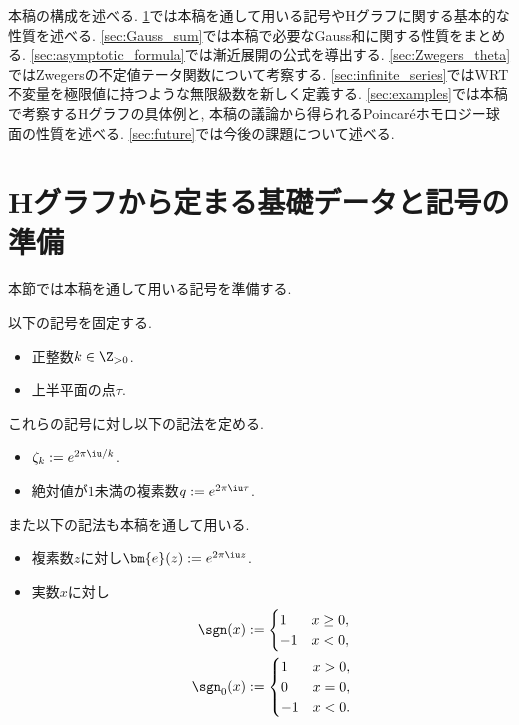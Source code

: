 \documentclass[11pt,b5paper,oneside,lualatex]{ltjsarticle} %
\numberwithin{equation}{section} %
\begin{document}
本稿の構成を述べる. 
\cref{sec:fund_data}では本稿を通して用いる記号やHグラフに関する基本的な性質を述べる. 
\cref{sec:Gauss_sum}では本稿で必要なGauss和に関する性質をまとめる. 
\cref{sec:asymptotic_formula}では漸近展開の公式を導出する. 
\cref{sec:Zwegers_theta}ではZwegersの不定値テータ関数について考察する. 
\cref{sec:infinite_series}ではWRT不変量を極限値に持つような無限級数を新しく定義する. 
\cref{sec:examples}では本稿で考察するHグラフの具体例と, 本稿の議論から得られるPoincar\'{e}ホモロジー球面の性質を述べる. 
\cref{sec:future}では今後の課題について述べる. 


\section{Hグラフから定まる基礎データと記号の準備} \label{sec:fund_data}


本節では本稿を通して用いる記号を準備する. 

以下の記号を固定する. 

\begin{symb}
	\begin{itemize}
		\item 正整数$ k \in \Z_{>0} $.
		\item 上半平面の点$ \tau $.
	\end{itemize}
\end{symb}

これらの記号に対し以下の記法を定める. 

\begin{dfn}
	\begin{itemize}
		\item $ \zeta_k := e^{2\pi\iu/k} $.
		\item 絶対値が$ 1 $未満の複素数$ q := e^{2\pi\iu\tau} $.
	\end{itemize}
\end{dfn}

また以下の記法も本稿を通して用いる. 

\begin{dfn}
	\begin{itemize}
		\item 複素数$ z $に対し$ \bm{e}(z) := e^{2\pi\iu z} $.
		\item 実数$ x $に対し
		\begin{align}
			\sgn(x) &:= 
			\begin{cases}
				1 & x \ge 0, \\
				-1 & x < 0,
			\end{cases}
		\\
		\sgn_0(x) &:= 
		\begin{cases}
			1 & x > 0, \\
			0 & x = 0, \\
			-1 & x < 0.
		\end{cases}
		\end{align}
	\end{itemize}
\end{dfn}
\end{document}
